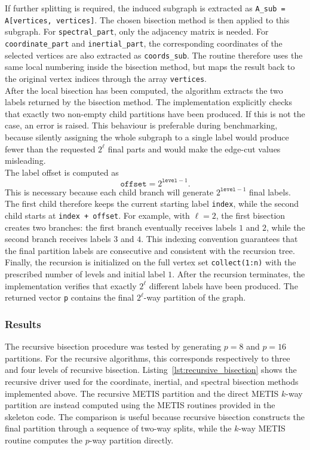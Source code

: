 \documentclass[unicode,10pt,a4paper,oneside,numbers=endperiod,openany]{scrartcl}
\begin{document}
If further splitting is required, the induced subgraph is extracted as
\texttt{A\_sub = A[vertices, vertices]}. The chosen bisection method is then applied to this
subgraph. For \texttt{spectral\_part}, only the adjacency matrix is needed. For \texttt{coordinate\_part}
and \texttt{inertial\_part}, the corresponding coordinates of the selected vertices are also extracted
as \texttt{coords\_sub}. The routine therefore uses the same local numbering inside the bisection
method, but maps the result back to the original vertex indices through the array \texttt{vertices}.\\

After the local bisection has been computed, the algorithm extracts the two labels returned by the
bisection method. The implementation explicitly checks that exactly two non-empty child partitions
have been produced. If this is not the case, an error is raised. This behaviour is preferable during
benchmarking, because silently assigning the whole subgraph to a single label would produce fewer than
the requested \(2^\ell\) final parts and would make the edge-cut values misleading.\\

The label offset is computed as
\[
    \texttt{offset} = 2^{\texttt{level}-1}.
\]
This is necessary because each child branch will generate \(2^{\texttt{level}-1}\) final labels. The
first child therefore keeps the current starting label \texttt{index}, while the second child starts at
\texttt{index + offset}. For example, with \(\ell=2\), the first bisection creates two branches:
the first branch eventually receives labels \(1\) and \(2\), while the second branch receives labels
\(3\) and \(4\). This indexing convention guarantees that the final partition labels are consecutive
and consistent with the recursion tree.\\

Finally, the recursion is initialized on the full vertex set \texttt{collect(1:n)} with the prescribed
number of levels and initial label \(1\). After the recursion terminates, the implementation verifies
that exactly \(2^\ell\) different labels have been produced. The returned vector \texttt{p} contains
the final \(2^\ell\)-way partition of the graph.

\subsubsection{Results}
The recursive bisection procedure was tested by generating \(p=8\) and \(p=16\) partitions.
For the recursive algorithms, this corresponds respectively to three and four levels of recursive
bisection. Listing~\ref{lst:recursive_bisection} shows the recursive driver used for the coordinate,
inertial, and spectral bisection methods implemented above. The recursive METIS partition and the
direct METIS \(k\)-way partition are instead computed using the METIS routines provided in the
skeleton code. The comparison is useful because recursive bisection constructs the final partition
through a sequence of two-way splits, while the \(k\)-way METIS routine computes the \(p\)-way
partition directly.
\end{document}
